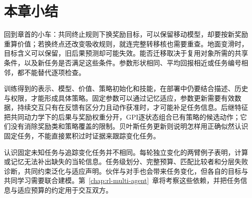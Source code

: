 \section{本章小结}
\label{sec:rl-transfer-summary}

回到章首的小车：共同终止规则下换奖励目标，可以保留移动模型，却要按新奖励重算价值；若换终点还改变吸收规则，就连完整转移核也需要重查。地面变滑时，目标含义可以保留，旧后果预测却可能失效。能否迁移取决于复用对象所需的共享条件，以及新任务是否满足这些条件。参数形状相同、平均回报相近或任务编号相邻，都不能替代逐项检查。

训练得到的表示、模型、价值、策略初始化和技能，在部署中仍要结合描述、历史与权限，才能形成具体策略。固定参数可以通过记忆适应，参数更新需要有效数据，持续交互只有在反馈有区分力且动作获准时，才可能补足任务信息。后继特征把共同动力学下的后果与奖励权重分开，GPI逐状态组合已有策略的候选动作；它们没有消除奖励类和策略覆盖的限制。贝叶斯任务更新则说明怎样用正确似然认识固定任务，不能直接累积过时证据来跟踪变化任务。

认识固定未知任务与追踪变化任务并不相同。每轮独立变化的两臂例子表明，计算或记忆无法补出缺失的当轮信息。任务级划分、完整预算、匹配比较者和分层失败诊断，共同约束泛化与适应声明。伙伴与对手也会带来任务变化，但各自的目标与共同学习需要联合建模。第~\ref{chap:rl-multi-agent}~章将考察这些依赖，并把任务信息与适应预算的约定用于交互双方。
